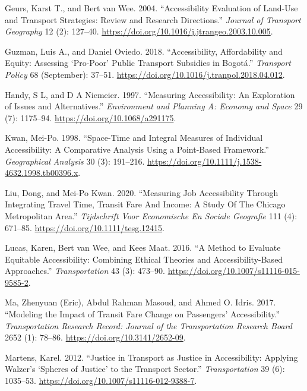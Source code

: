 \documentclass[msc,numbers]{coppe}
\begin{document}
\begin{CSLReferences}{1}{0}
  \leavevmode\hypertarget{ref-geurs2004accessibility}{}%
  Geurs, Karst T., and Bert van Wee. 2004. {``Accessibility Evaluation of Land-Use and Transport Strategies: Review and Research Directions.''} \emph{Journal of Transport Geography} 12 (2): 127--40. \url{https://doi.org/10.1016/j.jtrangeo.2003.10.005}.

  \leavevmode\hypertarget{ref-guzman2018accessibility}{}%
  Guzman, Luis A., and Daniel Oviedo. 2018. {``Accessibility, Affordability and Equity: {Assessing} {`Pro-Poor'} Public Transport Subsidies in {Bogotá}.''} \emph{Transport Policy} 68 (September): 37--51. \url{https://doi.org/10.1016/j.tranpol.2018.04.012}.

  \leavevmode\hypertarget{ref-handy1997measuring}{}%
  Handy, S L, and D A Niemeier. 1997. {``Measuring {Accessibility}: {An Exploration} of {Issues} and {Alternatives}.''} \emph{Environment and Planning A: Economy and Space} 29 (7): 1175--94. \url{https://doi.org/10.1068/a291175}.

  \leavevmode\hypertarget{ref-kwan1998spacetime}{}%
  Kwan, Mei-Po. 1998. {``Space-{Time} and {Integral Measures} of {Individual Accessibility}: {A Comparative Analysis Using} a {Point}-Based {Framework}.''} \emph{Geographical Analysis} 30 (3): 191--216. \url{https://doi.org/10.1111/j.1538-4632.1998.tb00396.x}.

  \leavevmode\hypertarget{ref-liu2020measuring}{}%
  Liu, Dong, and Mei-Po Kwan. 2020. {``Measuring {Job Accessibility Through Integrating Travel Time}, {Transit Fare And Income}: {A Study Of The Chicago Metropolitan Area}.''} \emph{Tijdschrift Voor Economische En Sociale Geografie} 111 (4): 671--85. \url{https://doi.org/10.1111/tesg.12415}.

  \leavevmode\hypertarget{ref-lucas2016method}{}%
  Lucas, Karen, Bert van Wee, and Kees Maat. 2016. {``A Method to Evaluate Equitable Accessibility: Combining Ethical Theories and Accessibility-Based Approaches.''} \emph{Transportation} 43 (3): 473--90. \url{https://doi.org/10.1007/s11116-015-9585-2}.

  \leavevmode\hypertarget{ref-ma2017modeling}{}%
  Ma, Zhenyuan (Eric), Abdul Rahman Masoud, and Ahmed O. Idris. 2017. {``Modeling the {Impact} of {Transit Fare Change} on {Passengers}' {Accessibility}.''} \emph{Transportation Research Record: Journal of the Transportation Research Board} 2652 (1): 78--86. \url{https://doi.org/10.3141/2652-09}.

  \leavevmode\hypertarget{ref-martens2012justice}{}%
  Martens, Karel. 2012. {``Justice in Transport as Justice in Accessibility: Applying {Walzer}'s {`{Spheres} of {Justice}'} to the Transport Sector.''} \emph{Transportation} 39 (6): 1035--53. \url{https://doi.org/10.1007/s11116-012-9388-7}.


\end{CSLReferences}
\end{document}

